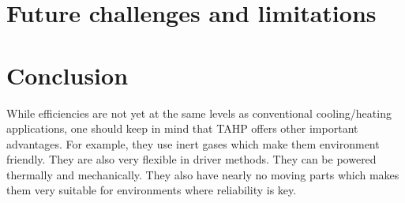 \documentclass[a4paper]{article}
\begin{document}
\section{Future challenges and limitations}

\section{Conclusion}
While efficiencies are not yet at the same levels as conventional cooling/heating applications, one should keep in mind that TAHP offers other important advantages. For example, they use inert gases which make them environment friendly. They are also very flexible in driver methods. They can be powered thermally and mechanically. They also have nearly no moving parts which makes them very suitable for environments where reliability is key.
\newpage


\end{document}
